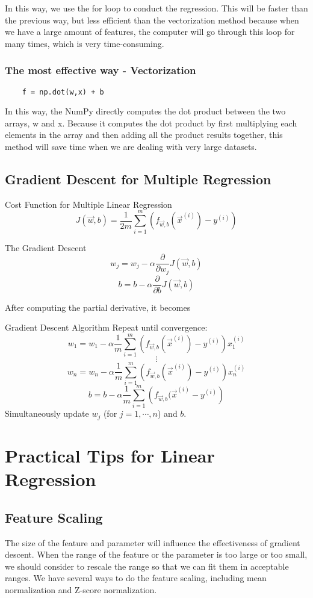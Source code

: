 \documentclass[12pt,a4paper]{article}
\begin{document}
In this way, we use the for loop to conduct the regression. This will be faster than the previous way, but less efficient than the vectorization method because when we have a large amount of features, the computer will go through this loop for many times, which is very time-consuming. 

\subsubsection{The most effective way - Vectorization}
\begin{lstlisting}
	f = np.dot(w,x) + b
\end{lstlisting}

In this way, the NumPy directly computes the dot product between the two arrays, w and x. Because it computes the dot product by first multiplying each elements in the array and then adding all the product results together, this method will save time when we are dealing with very large datasets. 

\subsection{Gradient Descent for Multiple Regression}
\begin{thmbox}{Cost Function for Multiple Linear Regression}
	$$J(\vec{w},b)=\frac{1}{2m}\sum_{i=1}^{m}\left(f_{\vec{w},b}(\vec{x}^{(i)})-y^{(i)}\right)$$
\end{thmbox}
\begin{thmbox}{The Gradient Descent}
	$$w_j=w_j-\alpha\frac{\partial}{\partial w_j}J(\vec{w},b)$$
	$$b=b-\alpha\frac{\partial}{\partial b}J(\vec{w},b)$$
\end{thmbox}
After computing the partial derivative, it becomes
\begin{rmkbox}{Gradient Descent Algorithm}
	Repeat until convergence: 
	$$w_1=w_1-\alpha\frac{1}{m}\sum_{i=1}^{m}\left(f_{\vec{w},b}(\vec{x}^{(i)})-y^{(i)}\right)x_1^{(i)}$$
	$$\vdots$$
	$$w_n=w_n-\alpha\frac{1}{m}\sum_{i=1}^{m}\left(f_{\vec{w},b}(\vec{x}^{(i)})-y^{(i)}\right)x_n^{(i)}$$
	$$b=b-\alpha\frac{1}{m}\sum_{i=1}^{m}\left(f_{\vec{w},b}(\vec{x}^{(i)}-y^{(i)}\right)$$
	Simultaneously update $w_j$ (for $j=1,\cdots,n$) and $b$.
\end{rmkbox}

\section{Practical Tips for Linear Regression}
\subsection{Feature Scaling}
\quad The size of the feature and parameter will influence the effectiveness of gradient descent. When the range of the feature or the parameter is too large or too small, we should consider to rescale the range so that we can fit them in acceptable ranges. We have several ways to do the feature scaling, including mean normalization and Z-score normalization. 
\end{document}
